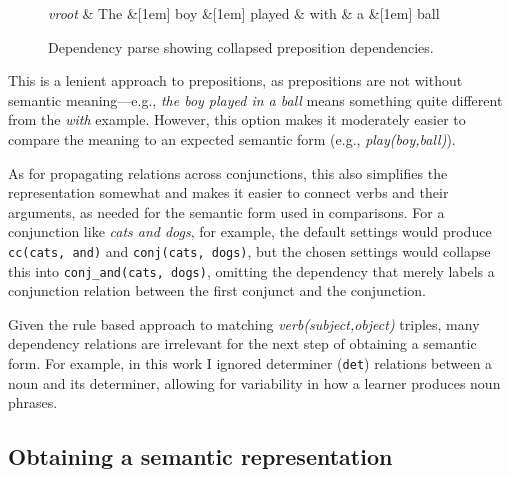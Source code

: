 \begin{figure}[htb!]
\begin{center}
    \begin{dependency}[arc edge,text only label,label style={above}]
    \begin{deptext}[column sep=.5em]
      \textit{vroot} \& The \&[1em] boy \&[1em] played \& with \& a \&[1em] ball \\
    \end{deptext}
  \end{dependency}
\end{center}
\caption{Dependency parse showing collapsed preposition dependencies.}
\label{fig:prep-dependency}
\end{figure}

This is a lenient approach to prepositions, as prepositions
are not without semantic meaning---e.g., \textit{the boy played in a
  ball} means something quite different from the \textit{with} example.  However, this option makes it moderately easier to compare the meaning to an expected semantic form (e.g., \textit{play(boy,ball)}).

As for propagating relations across conjunctions, this also simplifies the representation somewhat and makes it easier to connect verbs and their arguments, as needed for the semantic
form used in comparisons. For a conjunction like \textit{cats and dogs}, for example, the default settings would produce \texttt{cc(cats, and)} and \texttt{conj(cats, dogs)}, but the chosen settings would collapse this into \texttt{conj\_and(cats, dogs)}, omitting the dependency that merely labels a conjunction relation between the first conjunct and the conjunction.

Given the rule based approach to matching \textit{verb(subject,object)} triples, many dependency relations are irrelevant for the next step of obtaining a semantic form.  For example, in this work I ignored determiner (\texttt{det}) relations between a noun and its determiner, allowing for variability in how a learner produces
noun phrases. 

\subsection{Obtaining a semantic representation}
\label{sec:semantic-form}

